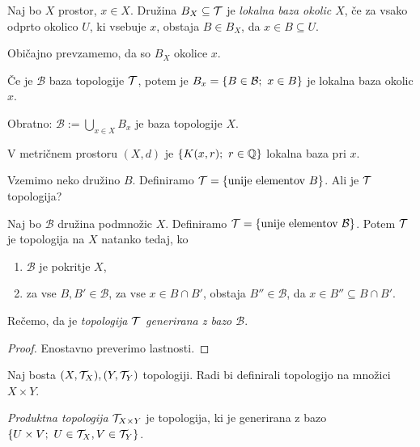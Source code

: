 \begin{definicija}
    Naj bo $X$ prostor, $x \in X$. Družina $B_X \subseteq \mathcal{T}$ je \emph{lokalna baza okolic $X$}, če za vsako odprto okolico $U$, ki vsebuje $x$, obstaja $B \in B_X$, da $x \in B \subseteq U$. 
\end{definicija}

\begin{opomba}
    Običajno prevzamemo, da so $B_X$ okolice $x$.
\end{opomba}

\begin{trditev}
    Če je $\mathcal{B}$ baza topologije $\mathcal{T}$, potem je $B_x = \left\{B \in \mathcal{B}; \ x \in B\right\}$ je lokalna baza okolic $x$.

    Obratno: $\mathcal{B} := \bigcup_{x \in X} B_x$ je baza topologije $X$.
\end{trditev}

\begin{primer}
    V metričnem prostoru $(X, d)$ je $\left\{K(x,r); \ r \in \mathbb{Q}\right\}$ lokalna baza pri $x$.
\end{primer}

\newpage
Vzemimo neko družino $B$. Definiramo $\mathcal{T} = \left\{\text{unije elementov } B\right\}$. Ali je $\mathcal{T}$ topologija?

\begin{trditev}
    \label{trd:baza}
    Naj bo $\mathcal{B}$ družina podmnožic $X$. Definiramo $\mathcal{T} = \left\{\text{unije elementov } \mathcal{B}\right\}$. Potem $\mathcal{T}$ je topologija na $X$ natanko tedaj, ko
    \begin{enumerate}
        \item $\mathcal{B}$ je pokritje $X$,
        \item za vse $B, B' \in \mathcal{B}$, za vse $x \in B \cap B'$, obstaja $B'' \in \mathcal{B}$, da $x \in B'' \subseteq B \cap B'$.
    \end{enumerate} 
    Rečemo, da je \emph{topologija $\mathcal{T}$ generirana z bazo $\mathcal{B}$}.
\end{trditev}

\begin{proof}
    Enostavno preverimo lastnosti.
\end{proof}

Naj bosta $(X, \mathcal{T}_X), (Y, \mathcal{T}_Y)$ topologiji. Radi bi definirali topologijo na množici $X \times Y$.

\begin{definicija}
    \emph{Produktna topologija} $\mathcal{T}_{X \times Y}$ je topologija, ki je generirana z bazo $\left\{U \times V; \ U \in \mathcal{T}_X, V \in \mathcal{T}_Y\right\}$.
\end{definicija}

